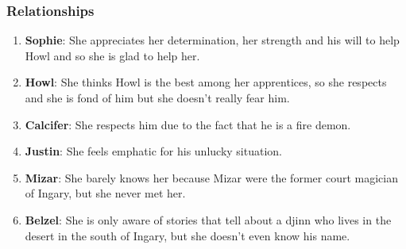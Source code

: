 




\subsubsection*{Relationships}
\begin{enumerate}
\item \textbf{Sophie}: She appreciates her determination, her strength and his will to help Howl and so she is glad to help her.
\item \textbf{Howl}: She thinks Howl is the best among her apprentices, so she respects and she is fond of him but she doesn't really  fear him.
\item \textbf{Calcifer}: She respects him due to the fact that he is a fire demon.
\item \textbf{Justin}: She feels emphatic for his unlucky situation.
\item \textbf{Mizar}: She barely knows her because Mizar were the former court magician of Ingary, but she never met her.
\item \textbf{Belzel}: She is only aware of stories that tell about a djinn who lives in the desert in the south of Ingary, but she doesn't even know his name.
\end{enumerate}

